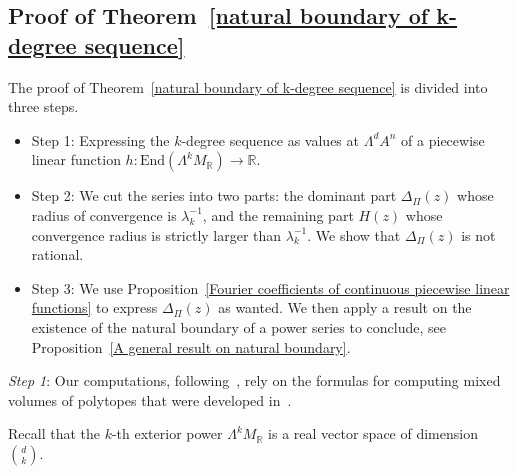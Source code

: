 \documentclass[11pt,a4paper]{article}
\theoremstyle{plain}
\theoremstyle{remark}
\theoremstyle{custombold}
\begin{document}
\subsection{Proof of Theorem~\ref{natural boundary of k-degree sequence}}

The proof of Theorem~\ref{natural boundary of k-degree sequence} is divided into three steps. 
\begin{itemize}
    \item Step 1: Expressing the $k$-degree sequence as values at $\Lambda^dA^n$ of a piecewise linear function $h\colon\mathrm{End}(\Lambda^kM_{\mathbb R})\rightarrow\mathbb R$. 
    \item Step 2: We cut the series into two parts: the dominant part $\Delta_{\Pi}(z)$ whose radius of convergence is $\lambda_k^{-1}$, and the remaining part $H(z)$ whose convergence radius is strictly larger than $\lambda_k^{-1}$. We show that $\Delta_{\Pi}(z)$ is not rational.
    \item Step 3: We use Proposition~\ref{Fourier coefficients of continuous piecewise linear functions} to express $\Delta_{\Pi}(z)$ as wanted. We then apply a result on the existence of the natural boundary of a power series to conclude, see Proposition~\ref{A general result on natural boundary}.
    \end{itemize}
\medskip
\noindent
\emph{Step 1}: Our computations, following~\cite{Lin-Wulcan-2014}, rely on the formulas for computing mixed volumes of polytopes that were developed in~\cite{Huber-Sturmfels-1995}.

Recall that the $k$-th exterior power $\Lambda^k M_{\mathbb R}$ is a real vector space of dimension $\binom{d}{k}$.
\end{document}
